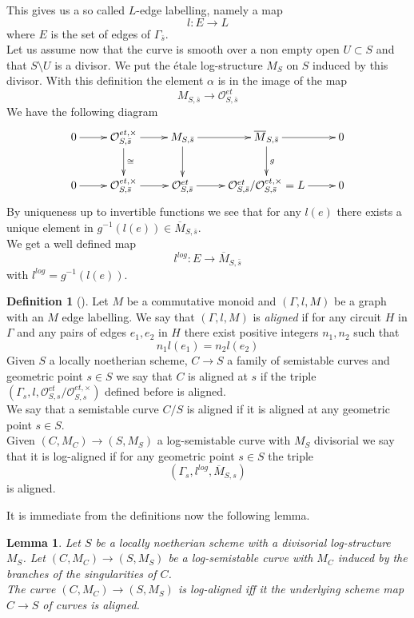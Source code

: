 \documentclass{amsart}
\newtheorem{lm}[thm]{Lemma}
\theoremstyle{definition}
\newtheorem{definition}[thm]{Definition}
\numberwithin{equation}{section}
\begin{document}
\noindent This gives us a so called $L$-edge labelling, namely a map
$$
l:E{\rightarrow} L
$$
\noindent where $E$ is the set of edges of $\Gamma_{\bar{s}}$.\\
Let us assume now that the curve is smooth over a non empty open $U\subset S$ and that $S\setminus U$ is a divisor. We put the \'etale log-structure $M_S$ on $S$ induced by this divisor. 
With this definition the element $\alpha$ is in the image of the map
$$
M_{S,\bar{s}}{\rightarrow} {\mathcal{O}}_{S,\bar{s}}^{et}
$$
\noindent We have the following diagram
$$
\xymatrix{
    {0}\ar[r] & {{\mathcal{O}}_{S,\bar{s}}^{et,\times}}\ar[r]\ar[d]^{\cong} & {M_{S,\bar{s}}}\ar[d]\ar[r] & {\overline{M}_{S,\bar{s}}}\ar[r] \ar[d]^{g}&{0}\\
    {0}\ar[r] & {{\mathcal{O}}_{S,\bar{s}}^{et,\times}}\ar[r] & {{\mathcal{O}}_{S,\bar{s}}^{et}}\ar[r] & {{\mathcal{O}}_{S,\bar{s}}^{et}/{\mathcal{O}}_{S,\bar{s}}^{et,\times}=L}\ar[r] & {0}\\
}
$$
\noindent By uniqueness up to invertible functions we see that for any $l(e)$ there exists a unique element in $g^{-1}(l(e))\in \overline{M}_{S,\bar{s}}$.\\
We get a well defined map
$$
l^{log}: E{\rightarrow} \overline{M}_{S,\bar{s}}
$$
\noindent with $l^{log}=g^{-1}(l(e))$.\\
\begin{definition}[\cite{hol}]\label{defaligned}
Let $M$ be a commutative monoid and $(\Gamma,l,M)$ be a graph with an $M$ edge labelling. We say that $(\Gamma,l,M)$ is \emph{aligned} if for any circuit $H$ in $\Gamma$ and any pairs of edges $e_1,e_2$ in $H$ there exist positive integers $n_1,n_2$ such that
$$
n_1l(e_1)=n_2l(e_2)
$$
\noindent Given $S$ a locally noetherian scheme, $C{\rightarrow} S$ a family of semistable curves and geometric point $s\in S$ we say that $C$ is aligned at $s$ if the triple $(\Gamma_{s},l,{\mathcal{O}}_{S,s}^{et}/{\mathcal{O}}_{S,s}^{et,\times})$ defined before is aligned. \\
We say that a semistable curve $C/S$ is aligned if it is aligned at any geometric point $s\in S$.\\
Given $(C,M_C){\rightarrow} (S,M_S)$ a log-semistable curve with $M_S$ divisorial
we say that it is log-aligned if for any geometric point $s\in S$ the triple
$$
(\Gamma_{s},l^{log},\overline{M}_{S,s})
$$
\noindent is aligned.
\end{definition}
It is immediate from the definitions now the following lemma.
\begin{lm}
Let $S$ be a locally noetherian scheme with a divisorial log-structure $M_S$. Let $(C,M_C){\rightarrow} (S,M_S)$ be a log-semistable curve with $M_C$ induced by the branches of the singularities of $C$.\\ 
The curve $(C,M_C){\rightarrow} (S,M_S)$ is log-aligned iff it the underlying scheme map $C{\rightarrow} S$ of curves is aligned.
\end{lm}
\end{document}
